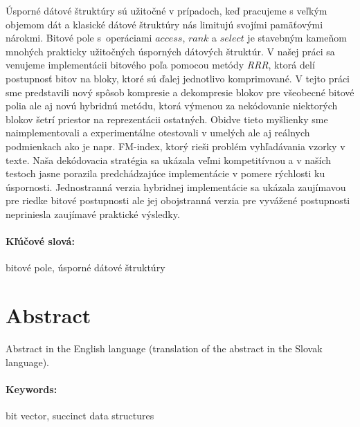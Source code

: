 \documentclass[12pt, twoside]{book}
\def\access{\mathit{access}}
\def\rank{\mathit{rank}}
\def\select{\mathit{select}}
\begin{document}
Úsporné dátové štruktúry sú užitočné v prípadoch, keď pracujeme s veľkým
objemom dát a klasické dátové štruktúry nás limitujú
svojími pamäťovými nárokmi. Bitové pole s~operáciami $\access$,
$\rank$ a $\select$ je stavebným kameňom mnohých prakticky užitočných
úsporných dátových štruktúr. V našej práci sa venujeme implementácii
bitového poľa pomocou metódy \textit{RRR}, ktorá delí postupnosť bitov na
bloky, ktoré sú ďalej jednotlivo komprimované. V tejto práci sme
predstavili nový spôsob kompresie a dekompresie blokov pre všeobecné
bitové polia ale aj novú hybridnú metódu, ktorá výmenou za nekódovanie niektorých
blokov šetrí priestor na reprezentácii ostatných. Obidve tieto
myšlienky sme naimplementovali a experimentálne otestovali v umelých
ale aj reálnych podmienkach ako je napr. FM-index, ktorý rieši problém
vyhľadávania vzorky v texte. Naša dekódovacia stratégia sa ukázala veľmi
kompetitívnou a v naších testoch jasne porazila predchádzajúce implementácie
v pomere rýchlosti ku úspornosti. Jednostranná verzia hybridnej implementácie
sa ukázala zaujímavou pre riedke bitové postupnosti ale jej obojstranná verzia
pre vyvážené postupnosti nepriniesla zaujímavé praktické výsledky.

\paragraph*{Kľúčové slová:} bitové pole, úsporné dátové štruktúry


\newpage 
\section*{Abstract}

Abstract in the English language (translation of the abstract in the
Slovak language).


\paragraph*{Keywords:} bit vector, succinct data structures


%
%
\end{document}
